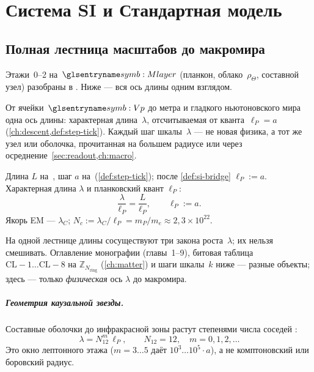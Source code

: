 \chapter{Система SI и Стандартная модель}
\label{ch:si-sm}

\section{Полная лестница масштабов до макромира}
\label{sec:full-ladder}

Этажи~0--2 на~$\Mlayer$ (планкон, облако~$\rho_\Theta$, составной узел)
разобраны в .
Ниже --- вся ось длины одним взглядом.

От ячейки~$\hv$ до метра и гладкого ньютоновского мира одна ось длины:
характерная длина~$\lambda$, отсчитываемая от кванта~$\ell_P=a$ (\cref{ch:descent,def:step-tick}).
Каждый шаг шкалы~$\lambda$ --- не новая физика, а тот же узел или оболочка,
прочитанная на большем радиусе или через осреднение~\cref{sec:readout,ch:macro}.

\begin{definition}
\label{def:hop-count}
Длина $L$ на~\Tlayer, шаг $a$ на~\Mlayer (\cref{def:step-tick}); после \cref{def:si-bridge} $\ell_P:=a$.
Характерная длина $\lambda$ и планковский квант $\ell_P$:
\begin{equation}
  \frac{\lambda}{\ell_P}
  = \frac{L}{\ell_P},\qquad
  \ell_P := a.
\end{equation}
Якорь EM --- $\lambda_C$; $N_c:=\lambda_C/\ell_P=m_P/m_e\approx 2{,}3\times 10^{22}$.
\end{definition}

На одной лестнице длины сосуществуют три закона роста~$\lambda$; их нельзя смешивать.
Оглавление монографии (главы~1--9), битовая таблица $\mathrm{CL}{-}1\ldots\mathrm{CL}{-}8$
на $\mathbb{Z}_{N_{\mathrm{ring}}}$ (\cref{ch:matter}) и шаги шкалы~$k$ ниже ---
разные объекты; здесь --- только \emph{физическая} ось $\lambda$ до макромира.

\paragraph{Геометрия каузальной звезды.}
Составные оболочки до инфракрасной зоны растут степенями числа соседей \latGCKshort:
\[
  \lambda=N_{12}^{m}\,\ell_P,\qquad N_{12}=12,\quad m=0,1,2,\ldots
\]
Это окно лептонного этажа ($m=3\ldots 5$ даёт $10^3\ldots 10^5\cdot a$),
а не комптоновский или боровский радиус.

